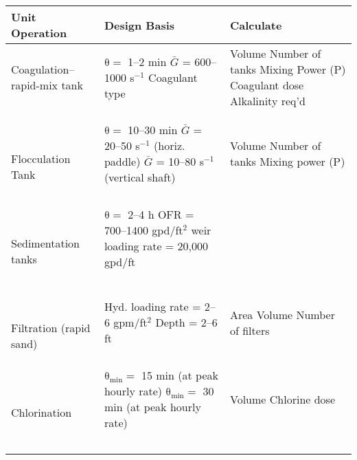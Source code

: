 \documentclass[11pt,letterpaper]{article}
\begin{document}
\begin{minipage}{\linewidth}
\centering
{} \label{tab:title}

\begin{tabular}{|p{50mm}|p{50mm}|p{50mm}|}\toprule[1.25pt]
\bf Unit Operation	& \bf Design Basis 	& \bf Calculate	\\\midrule
Coagulation--rapid-mix tank	& $\mathrm{\theta =}$ 1--2 min \newline $\bar{G}$ = 600--1000 s$^{-1}$ \newline Coagulant type & Volume \newline Number of tanks \newline Mixing Power (P) \newline Coagulant dose \newline Alkalinity req'd\\ \hline\

Flocculation Tank 	& $\mathrm{\theta =}$ 10--30 min \newline $\bar{G}$ = 20--50 s$^{-1}$ (horiz. paddle) \newline $\bar{G}$ = 10--80 s$^{-1}$ (vertical shaft)	& Volume \newline Number of tanks \newline Mixing power (P)\\ \hline\

Sedimentation tanks & $\mathrm{\theta =}$ 2--4 h \newline OFR = 700--1400 gpd/ft$^2$ \newline weir loading rate = 20,000 gpd/ft\\ \hline\

Filtration (rapid sand) & Hyd. loading rate = 2--6 gpm/ft$^2$ \newline Depth = 2--6 ft & Area \newline Volume \newline Number of filters\\ \hline\

Chlorination & $\mathrm{\theta_{min} =}$ 15 min (at peak hourly rate) \newline $\mathrm{\theta_{min} =}$ 30 min (at peak hourly rate) & Volume \newline Chlorine dose\\ \hline\


\bottomrule[1.25pt]

\end {tabular}\par
\end{minipage}\\
\end{document}
